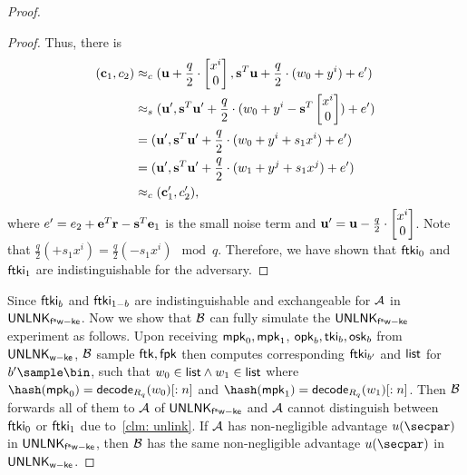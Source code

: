 \begin{proof}
\begin{proof}
Thus, there is
\begin{align*}
(\mathbf{c}_1,c_2) 
&\approx_c (\mathbf{u}+ \frac{q}{2}\cdot\begin{bmatrix}x^i\\0\end{bmatrix}, \mathbf{s}^T\mathbf{u}+\frac{q}{2}\cdot(w_0+y^i) + e') \\
&\approx_s (\mathbf{u}', \mathbf{s}^T\mathbf{u}'+\frac{q}{2}\cdot(w_0+y^i-\mathbf{s}^T\begin{bmatrix}x^i\\0\end{bmatrix}) + e')\\
&=(\mathbf{u}', \mathbf{s}^T\mathbf{u}'+\frac{q}{2}\cdot(w_0+y^i+s_1x^i) + e')\\
&=(\mathbf{u}', \mathbf{s}^T\mathbf{u}'+\frac{q}{2}\cdot(w_1+y^j+s_1x^j) + e')\\
&\approx_c (\mathbf{c}_1',c_2'),
\end{align*}
where $e'=e_2+\mathbf{e}^T\mathbf{r}-\mathbf{s}^T\mathbf{e}_1$ is the small noise term and $\mathbf{u}'=\mathbf{u}-\frac{q}{2}\cdot\begin{bmatrix}x^i\\0\end{bmatrix}$. Note that $\frac{q}{2} (+s_1x^i) = \frac{q}{2}(-s_1x^i)\mod q.$
Therefore, we have shown that $\mathsf{ftki}_0$ and $\mathsf{ftki}_1$ are indistinguishable for the adversary. 
\end{proof}
Since $\mathsf{ftki}_b$ and $\mathsf{ftki}_{1-b}$ are indistinguishable and exchangeable for $\mathcal{A}$ in $\mathsf{UNLNK}_\mathsf{f^sw-ke}$.
Now we show that $\mathcal{B}$ can fully simulate the $\mathsf{UNLNK}_\mathsf{f^sw-ke}$ experiment as follows. Upon receiving $\mathsf{mpk}_0,\mathsf{mpk}_1$, $\mathsf{opk}_b,\mathsf{tki}_b,\mathsf{osk}_b$ from $\mathsf{UNLNK}_\mathsf{w-ke}$, $\mathcal{B}$ sample $\mathsf{ftk},\mathsf{fpk}$ then computes corresponding $\mathsf{ftki}_{b'}$ and $\mathsf{list}$ for $b'\sample\bin$, such that $w_0\in\mathsf{list}\wedge w_1\in\mathsf{list}$ where $\hash(\mpk_0)=\msf{decode}_{R_q}(w_0)[:n]$ and $\hash(\mpk_1)=\msf{decode}_{R_q}(w_1)[:n]$.
Then $\mathcal{B}$ forwards all of them to $\mathcal{A}$ of $\mathsf{UNLNK}_\mathsf{f^sw-ke}$ and $\mathcal{A}$ cannot distinguish between $\mathsf{ftki}_0$ or $\mathsf{ftki}_1$ due to~\cref{clm: unlink}.
If $\mathcal{A}$ has non-negligible advantage $u(\secpar)$ in $\mathsf{UNLNK}_\mathsf{f^sw-ke}$, then $\mathcal{B}$ has the same non-negligible advantage $u(\secpar)$ in $\mathsf{UNLNK}_\mathsf{w-ke}$.
\end{proof}

